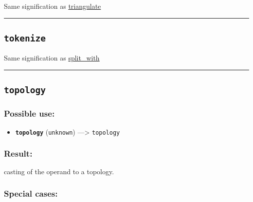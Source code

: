 \documentclass[]{book}
\providecommand{\tightlist}{%
  \setlength{\itemsep}{0pt}\setlength{\parskip}{0pt}}
\theoremstyle{definition}
\theoremstyle{definition}
\theoremstyle{definition}
\theoremstyle{remark}
\begin{document}
Same signification as \href{OperatorsSZ\#triangulate}{triangulate}

\begin{center}\rule{0.5\linewidth}{\linethickness}\end{center}

\subsection{\texorpdfstring{\texttt{tokenize}}{tokenize}}\label{tokenize}

Same signification as \href{OperatorsSZ\#split_with}{split\_with}

\begin{center}\rule{0.5\linewidth}{\linethickness}\end{center}

\subsection{\texorpdfstring{\texttt{topology}}{topology}}\label{topology}

\subsubsection{Possible use:}\label{possible-use-525}

\begin{itemize}
\tightlist
\item
  \textbf{\texttt{topology}} (\texttt{unknown}) ---\textgreater{}
  \texttt{topology}
\end{itemize}

\subsubsection{Result:}\label{result-507}

casting of the operand to a topology.

\subsubsection{Special cases:}\label{special-cases-138}
\end{document}
